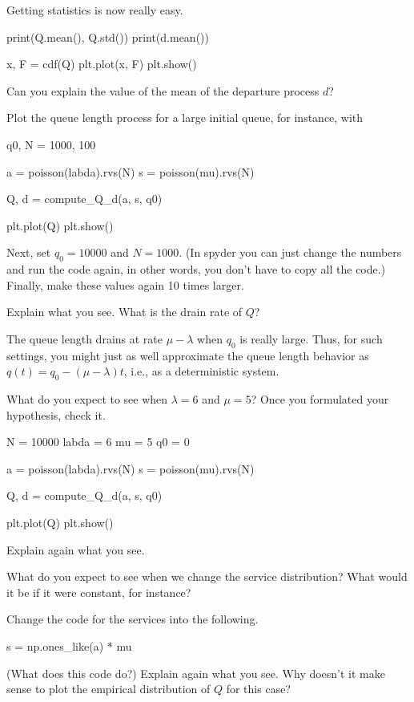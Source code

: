 \documentclass{scrartcl}
\begin{document}
\begin{exercise}
  Getting statistics is now really easy.
  \begin{pyverbatim}
print(Q.mean(), Q.std())
print(d.mean())
    
x, F = cdf(Q)
plt.plot(x, F)
plt.show()
  \end{pyverbatim}
Can you explain the value of the mean of the departure process $d$?
\end{exercise}

\begin{exercise}
Plot the queue length process for a large initial queue, for instance, with

\begin{pyverbatim}
q0, N = 1000, 100

a = poisson(labda).rvs(N)
s = poisson(mu).rvs(N)

Q, d = compute_Q_d(a, s, q0)

plt.plot(Q)
plt.show()
  \end{pyverbatim}

Next, set $q_0=10000$ and $N=1000$.  (In spyder you can just change the numbers and run the code again, in other words, you don't have to copy all the code.) Finally,  make these values again 10 times larger. 

Explain what you see. What is the drain rate of $Q$?
\begin{solution}
  The queue length drains at rate $\mu-\lambda$ when $q_0$ is really large. Thus, for such settings, you might just as well approximate the queue length behavior as $q(t) = q_0 - (\mu-\lambda)t$, i.e., as a deterministic system.
\end{solution}
\end{exercise}

\begin{exercise}
What do you expect to see when $\lambda=6$ and $\mu=5$? Once you formulated your hypothesis, check it.

\begin{pyverbatim}
N = 10000
labda = 6
mu = 5
q0 = 0

a = poisson(labda).rvs(N)
s = poisson(mu).rvs(N)

Q, d = compute_Q_d(a, s, q0)

plt.plot(Q)
plt.show()
  \end{pyverbatim}
Explain again what you see.
\end{exercise}

\begin{exercise}
What do you expect to see when we change the service distribution? What would it be if  it were constant,  for instance?

Change the code for the services into the following.
\begin{pyverbatim}
s = np.ones_like(a) * mu
\end{pyverbatim}
(What does this code do?) Explain again what you see. Why doesn't it make sense to plot the empirical distribution of $Q$ for this case?
\end{exercise}
\end{document}
